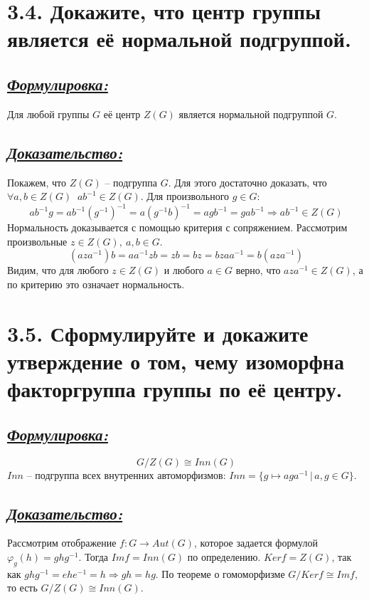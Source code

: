 \documentclass{article}
\begin{document}
\section*{\LARGE 3.4. Докажите, что центр группы является её нормальной подгруппой. }
\subsection*{\Large \underline{\textit{Формулировка: }}}
Для любой группы $G$ её центр $Z(G)$ является нормальной подгруппой $G$.

\subsection*{\Large \underline{\textit{Доказательство: }}}
Покажем, что $Z(G)$ -- подгруппа $G$. Для этого достаточно доказать, что
\newline $\forall a,b \in Z(G) \;\; a b^{-1} \in Z(G)$. Для произвольного $g \in G$:
$$
a b^{-1}  g = a b^{-1}(g^{-1})^{-1} = a(g^{-1} b)^{-1} = a g  b^{-1} = g  a  b^{-1} \Rightarrow a b^{-1} \in Z(G)
$$
Нормальность доказывается с помощью критерия с сопряжением. Рассмотрим произвольные $z\in Z(G), \: a, b \in G$.
$$ 
(a z a^{-1}) b = a a^{-1}  z  b = z  b = b  z = b  z  a  a^{-1} = b  (a   z   a^{-1})
$$
Видим, что для любого $z \in Z(G)$ и любого $a \in G$ верно, что $aza^{-1}\in Z(G)$, а по критерию это означает нормальность.

\section*{\LARGE 3.5. Сформулируйте и докажите утверждение о том, чему изоморфна факторгруппа группы по её центру. }
\subsection*{\Large \underline{\textit{Формулировка: }}}
$$G/Z(G) \cong Inn(G)$$
$Inn$ -- подгруппа всех внутренних автоморфизмов: $Inn = \{g \mapsto aga^{-1}\,|\, a,g \in G\}$.

\subsection*{\Large \underline{\textit{Доказательство:}}}
Рассмотрим отображение $f : G \rightarrow Aut(G)$, которое задается формулой 
\newline $\varphi_g(h) = ghg^{-1}$. Тогда $Imf = Inn(G)$ по определению. $Kerf = Z(G)$, так как $ghg^{-1} = ehe^{-1} = h \Rightarrow gh = hg$. По теореме о гомоморфизме $G / Kerf \cong Imf$, то есть $G / Z(G) \cong Inn(G)$. 
\end{document}
